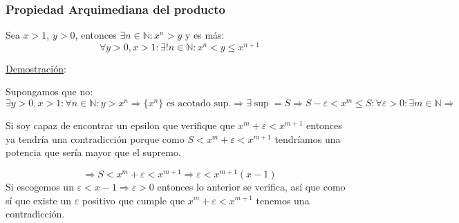 \documentclass[10pt,a4paper,openright]{book}
\begin{document}
\subsubsection*{Propiedad Arquimediana del producto}
Sea $x>1$, $y>0$, entonces $\exists n\in \mathbb N: x^n>y$ y es más:
$$\forall y>0, x>1: \exists! n\in\mathbb N: x^n<y\leq x^{n+1}$$

\underline{Demostración}:\par
Supongamos que no:
$$\exists y>0, x>1: \forall n\in \mathbb N: y>x^n\Rightarrow\{x^n\}\mbox{ es acotado sup.}\Rightarrow \exists \sup=S\Rightarrow S-\varepsilon< x^m\leq S: \forall \varepsilon>0:\exists m\in \mathbb N\Rightarrow$$

Si soy capaz de encontrar un epsilon que verifique que $x^m+\varepsilon<x^{m+1}$ entonces ya tendría una contradicción porque como $S<x^m+\varepsilon< x^{m+1}$ tendríamos una potencia que sería mayor que el supremo.

$$\Rightarrow S< x^m +\varepsilon <x^{m+1}\Rightarrow \varepsilon<x^{m+1}(x-1)$$
Si escogemos un $\varepsilon< x-1\Rightarrow \varepsilon>0$ entonces lo anterior se verifica, así que como sí que existe un $\varepsilon$ positivo que cumple que $x^m+\varepsilon< x^{m+1}$ tenemos una contradicción.
\end{document}
